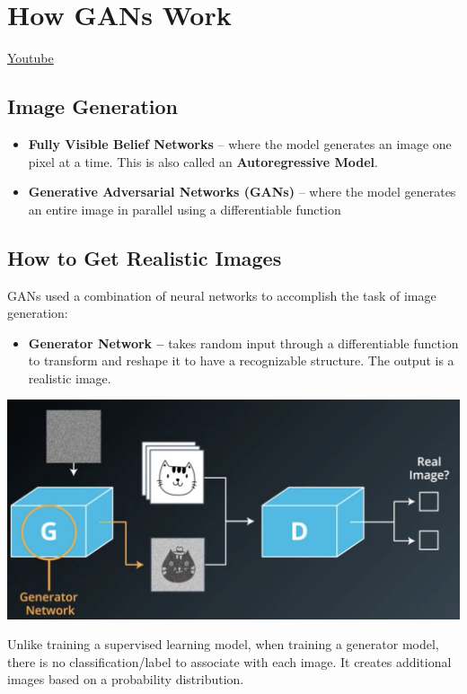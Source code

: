 \section{How GANs Work}
\href{https://www.youtube.com/watch?v=--LJlzpsrmA}{Youtube} \newline

\subsection{Image Generation}

\begin{itemize}
    \item \textbf{Fully Visible Belief Networks} – where the model generates an image one pixel at a time. This is also called an \textbf{Autoregressive Model}.
    \item \textbf{Generative Adversarial Networks (GANs)} – where the model generates an entire image in parallel using a differentiable function
\end{itemize}

\subsection{How to Get Realistic Images}
GANs used a combination of neural networks to accomplish the task of image generation:

\begin{itemize}
    \item \textbf{Generator Network –} takes random input through a differentiable function to transform and reshape it to have a recognizable structure. The output is a realistic image.
\end{itemize}

\includegraphics[width=0.5\linewidth]{img//genAdvNet/screen-shot-2022-06-30-at-7.04.47-pm.jpeg}

Unlike training a supervised learning model, when training a generator model, there is no classification/label to associate with each image. It creates additional images based on a probability distribution.


